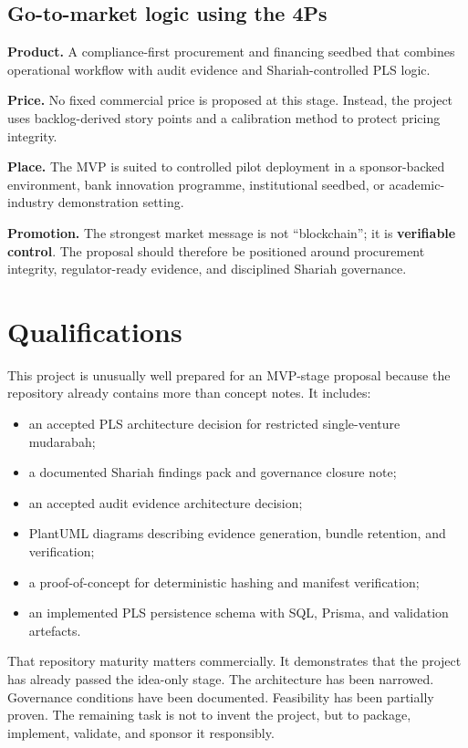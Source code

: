 \documentclass[11pt,a4paper]{article}
\begin{document}
\subsection{Go-to-market logic using the 4Ps}

\textbf{Product.} A compliance-first procurement and financing seedbed that combines operational workflow with audit evidence and Shariah-controlled PLS logic.

\textbf{Price.} No fixed commercial price is proposed at this stage. Instead, the project uses backlog-derived story points and a calibration method to protect pricing integrity.

\textbf{Place.} The MVP is suited to controlled pilot deployment in a sponsor-backed environment, bank innovation programme, institutional seedbed, or academic-industry demonstration setting.

\textbf{Promotion.} The strongest market message is not ``blockchain''; it is \textbf{verifiable control}. The proposal should therefore be positioned around procurement integrity, regulator-ready evidence, and disciplined Shariah governance.

\section{Qualifications}

This project is unusually well prepared for an MVP-stage proposal because the repository already contains more than concept notes. It includes:

\begin{itemize}
    \item an accepted PLS architecture decision for restricted single-venture mudarabah;
    \item a documented Shariah findings pack and governance closure note;
    \item an accepted audit evidence architecture decision;
    \item PlantUML diagrams describing evidence generation, bundle retention, and verification;
    \item a proof-of-concept for deterministic hashing and manifest verification;
    \item an implemented PLS persistence schema with SQL, Prisma, and validation artefacts.
\end{itemize}

That repository maturity matters commercially. It demonstrates that the project has already passed the idea-only stage. The architecture has been narrowed. Governance conditions have been documented. Feasibility has been partially proven. The remaining task is not to invent the project, but to package, implement, validate, and sponsor it responsibly.
\end{document}
